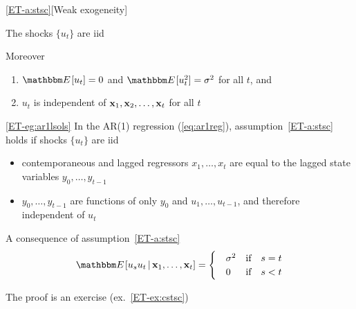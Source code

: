 \begin{frame}

    \vspace{2em}
    \Ass
    \eqref{ET-a:stsc}[Weak exogeneity]
    
    The shocks $\{u_t\}$ are {\sc iid}
    
    \vspace{.7em}
    Moreover
    \begin{enumerate}
        \item $\EE[u_t] = 0$ and $\EE[u_t^2] = \sigma^2$ for all $t$, and
        \item $u_t$ is independent of ${\mathbf x}_1, {\mathbf x}_2,\ldots,{\mathbf x}_t$ for
            all $t$
    \end{enumerate}
    
\end{frame}

\begin{frame}

    \vspace{2em}
    \Eg
    \eqref{ET-eg:ar1lsols}
    In the AR(1) regression (\ref{eq:ar1reg}), assumption~\ref{ET-a:stsc}
    holds if shocks $\{u_t\}$ are {\sc iid}
    \begin{itemize}
        \item
    contemporaneous and lagged regressors $x_1, \ldots, x_t$ are equal to the
    lagged state variables $y_0, \ldots, y_{t-1}$
        \item $y_0, \ldots, y_{t-1}$ are functions
    of only $y_0$ and $u_1,\ldots,u_{t-1}$, and therefore independent of $u_t$
    \end{itemize}
    
\end{frame}


\begin{frame}
    
    \vspace{2em}
    A consequence of assumption~\ref{ET-a:stsc} 
    \begin{equation*}
        \label{eq:cstsc}
        \EE[ u_s u_t \given \boldx_1, \ldots,\boldx_t]  
        = 
        \begin{cases}
            & \sigma^2 \quad \text{if} \quad s = t \\ 
            & 0 \quad \;\; \text{if} \quad s < t 
        \end{cases}
    \end{equation*}
    
    \vspace{.7em}
    The proof is an exercise (ex.~\ref{ET-ex:cstsc})
    
\end{frame}

